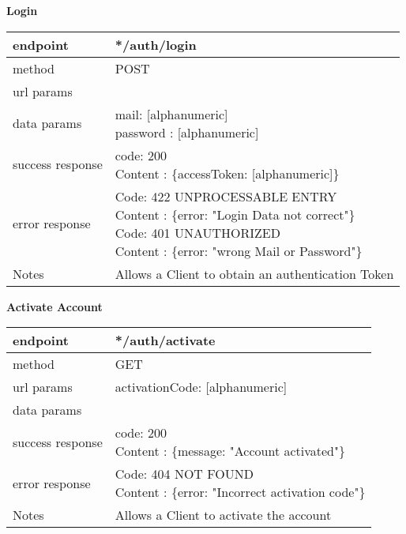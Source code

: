 \textbf{Login}

\begin{tabularx}{\linewidth}{| l | l |}
	\hline
	endpoint & */auth/login \\
	\hline
	method & POST \\
	\hline
	url params & \\
	\hline
	data params &
	\parbox{0.7\textwidth}{
		\bigskip
		mail: [alphanumeric]\\
		password : [alphanumeric]
		\bigskip
	} \\
	\hline
	success response &
	\parbox{0.7\textwidth}{
		\bigskip
		code: 200\\
		Content : \{accessToken: [alphanumeric]\}
		\bigskip
	} \\
	\hline
	error response &
	\parbox{0.7\textwidth}{
		\bigskip
		Code: 422 UNPROCESSABLE ENTRY \\
		Content : \{error: "Login Data not correct"\}\\
		Code: 401 UNAUTHORIZED \\
		Content : \{error: "wrong Mail or Password"\}
		\bigskip
	} \\
	\hline
	Notes & 
	\parbox{0.7\textwidth}{
		\bigskip Allows a Client to obtain an authentication Token
	\bigskip }\\
	\hline
\end{tabularx}

\textbf{Activate Account}

\begin{tabularx}{\linewidth}{| l | l |}
	\hline
	endpoint & */auth/activate \\
	\hline
	method & GET \\
	\hline
	url params &
	\parbox{0.7\textwidth}{
	\bigskip
	activationCode: [alphanumeric]
	\bigskip
	} 
	 \\
	\hline
	data params & \\
	\hline
	success response &
	\parbox{0.7\textwidth}{
		\bigskip
		code: 200\\
		Content : \{message: "Account activated"\}
		\bigskip
	} \\
	\hline
	error response &
	\parbox{0.7\textwidth}{
		\bigskip
		Code: 404 NOT FOUND \\
		Content : \{error: "Incorrect activation code"\}
		\bigskip
	} \\
	\hline
	Notes & 
	\parbox{0.7\textwidth}{
		\bigskip Allows a Client to activate the account 
	\bigskip}\\
	\hline
\end{tabularx}

